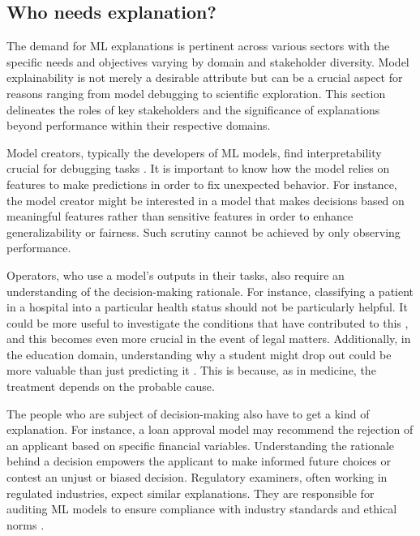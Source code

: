 \subsection{Who needs explanation?}

The demand for \gls{ML} explanations is pertinent across various sectors with the specific needs and objectives varying by domain and stakeholder diversity. Model explainability is not merely a desirable attribute but can be a crucial aspect for reasons ranging from model debugging to scientific exploration. This section delineates the roles of key stakeholders and the significance of explanations beyond performance within their respective domains.

Model creators, typically the developers of ML models, find interpretability crucial for debugging tasks \cite{Bhatt2020ExplainableDeployment}. It is important to know how the model relies on features to make predictions in order to fix unexpected behavior. For instance, the model creator might be interested in a model that makes decisions based on meaningful features rather than sensitive features in order to enhance generalizability or fairness. Such scrutiny cannot be achieved by only observing performance.

Operators, who use a model's outputs in their tasks, also require an understanding of the decision-making rationale. For instance, classifying a patient in a hospital into a particular health status should not be particularly helpful. It could be more useful to investigate the conditions that have contributed to this \cite{Razavian2015Population-levelFactors}, and this becomes even more crucial in the event of legal matters. Additionally, in the education domain, understanding why a student might drop out could be more valuable than just predicting it \cite{Pellagatti2021GeneralizedDropout,Berens2019EarlyMethods}. This is because, as in medicine, the treatment depends on the probable cause.

The people who are subject of decision-making also have to get a kind of explanation. For instance, a loan approval model may recommend the rejection of an applicant based on specific financial variables. Understanding the rationale behind a decision empowers the applicant to make informed future choices or contest an unjust or biased decision. Regulatory examiners, often working in regulated industries, expect similar explanations. They are responsible for auditing \gls{ML} models to ensure compliance with industry standards and ethical norms \cite{Chen2023Globally-ConsistentEvaluation, Flores2016FalseBlacks}. 

